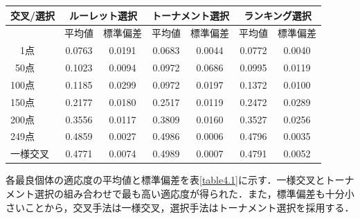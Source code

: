 \begin{table}[t]
\begin{center}
  \begin{tabular}{|l|c|c|c|c|c|c|} \hline
      交叉/選択&\multicolumn{2}{|c|}{ルーレット選択}&\multicolumn{2}{|c|}{トーナメント選択}&\multicolumn{2}{|c|}{ランキング選択}\\\hline
      &平均値&標準偏差&平均値&標準偏差&平均値&標準偏差\\\hline
      \ \ \:\:1点&0.0763&0.0191&0.0683&0.0044&0.0772&0.0040\\\hline
      \ \:50点&0.1023&0.0094&0.0972&0.0686&0.0995&0.0119\\\hline
      100点&0.1185&0.0299&0.0972&0.0197&0.1372&0.0100\\\hline
      150点&0.2177&0.0180&0.2517&0.0119&0.2472&0.0289\\\hline
      200点&0.3556&0.0117&0.3809&0.0160&0.3527&0.0256\\\hline
      249点&0.4859&0.0027&0.4986&0.0006&0.4796&0.0035\\\hline
      一様交叉&0.4771&0.0074&0.4989&0.0007&0.4791&0.0052\\\hline
    \end{tabular}

\end{center}
\end{table}

各最良個体の適応度の平均値と標準偏差を表\ref{table4.1}に示す．一様交叉とトーナメント選択の組み合わせで最も高い適応度が得られた．また，標準偏差も十分小さいことから，交叉手法は一様交叉，選択手法はトーナメント選択を採用する．